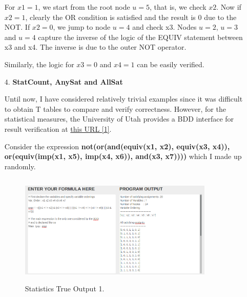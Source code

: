 \documentclass[a4paper, titlepage, 12pt]{article}
\numberwithin{equation}{section}
\begin{document}
\begin{itemize}
                    For $x1 = 1$, we start from the root node $u = 5$, that is, we check $x2$.
                    Now if $x2 = 1$, clearly the OR condition is satisfied and the result is 0 due to the NOT.
                    If $x2 = 0$, we jump to node $u = 4$ and check x3.
                    Nodes $u = 2$, $u = 3$ and $u = 4$ capture the inverse of the logic of the EQUIV statement between x3 and x4.
                    The inverse is due to the outer NOT operator.

                    Similarly, the logic for $x3 = 0$ and $x4 = 1$ can be easily verified.

                \item[4.] \textbf{StatCount, AnySat and AllSat}
                
                    Until now, I have considered relatively trivial examples since it was difficult to obtain T tables to compare and verify correctness.
                    However, for the statistical measures, the University of Utah provides a BDD interface for result verification at \href{http://formal.cs.utah.edu:8080/pbl/BDD.php}{this URL [1]}.

                    Consider the expression \textbf{not(or(and(equiv(x1, x2), equiv(x3, x4)), or(equiv(imp(x1, x5), imp(x4, x6)), and(x3, x7))))} which I made up randomly.

                    \begin{figure}[htp]
                        \centering
                        \includegraphics[height=200px, width=350px]{img/test_stats_true_1.png}
                        \caption{Statistics True Output 1.}
                        \label{fig:test_stats_true_1}
                    \end{figure}


\end{itemize}
\end{document}
